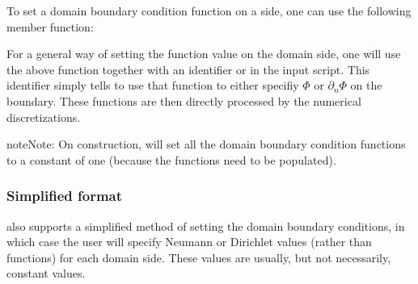 \documentclass[letterpaper,10pt,english]{sphinxmanual}
\begin{document}
\begin{sphinxVerbatim}[commandchars=\\\{\},formatcom=\scriptsize]
      
\end{sphinxVerbatim}

\sphinxAtStartPar
To set a domain boundary condition function on a side, one can use the following member function:

\begin{sphinxVerbatim}[commandchars=\\\{\},formatcom=\scriptsize]
   
                                            
                                                
\end{sphinxVerbatim}

\sphinxAtStartPar
For a general way of setting the function value on the domain side, one will use the above function together with an identifier  or  in the input script.
This identifier simply tells  to use that function to either specifiy \(\Phi\) or \(\partial_n\Phi\) on the boundary.
These functions are then directly processed by the numerical discretizations.

\begin{sphinxadmonition}{note}{Note:}
\sphinxAtStartPar
On construction,  will set all the domain boundary condition functions to a constant of one (because the functions need to be populated).
\end{sphinxadmonition}


\subsubsection{Simplified format}
\label{\detokenize{Solvers/Electrostatics:simplified-format}}
\sphinxAtStartPar
{} also supports a simplified method of setting the domain boundary conditions, in which case the user will specify Neumann or Dirichlet values (rather than functions) for each domain side.
These values are usually, but not necessarily, constant values.
\end{document}
